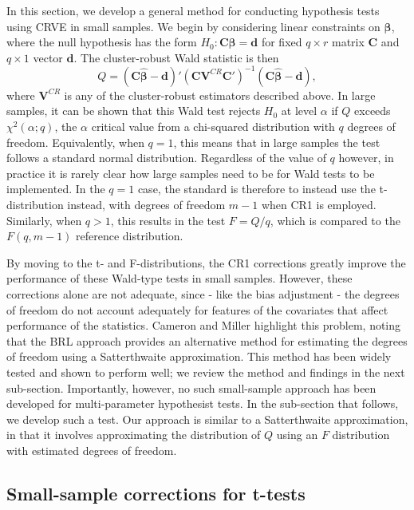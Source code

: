 \documentclass[12pt]{article}
\newcommand{\bm}{\mathbf}
\newcommand{\bs}{\boldsymbol}
\begin{document}
In this section, we develop a general method for conducting hypothesis tests using CRVE in small samples. We begin by considering linear constraints on $\bs\beta$, where the null hypothesis has the form $H_0: \bm{C}\bs\beta = \bm{d}$ for fixed $q \times r$ matrix $\bm{C}$ and $q \times 1$ vector $\bm{d}$. 
The cluster-robust Wald statistic  is then
\begin{equation}
\label{eq:Wald_stat}
Q = \left(\bm{C}\bs{\hat\beta} - \bm{d}\right)'\left(\bm{C} \bm{V}^{CR} \bm{C}'\right)^{-1}\left(\bm{C}\bs{\hat\beta} - \bm{d}\right),
\end{equation}
where $\bm{V}^{CR}$ is any of the cluster-robust estimators described above.
In large samples, it can be shown that this Wald test rejects $H_0$ at level $\alpha$ if $Q$ exceeds $\chi^2(\alpha; q)$, the $\alpha$ critical value from a chi-squared distribution with $q$ degrees of freedom. 
Equivalently, when $q = 1$, this means that in large samples the test follows a standard normal distribution. 
Regardless of the value of $q$ however, in practice it is rarely clear how large samples need to be for Wald tests to be implemented.
In the $q = 1$ case, the standard is therefore to instead use the t-distribution instead, with degrees of freedom $m - 1$ when CR1 is employed.
Similarly, when $q > 1$, this results in the test $F = Q/q$, which is compared to the $F(q, m - 1)$ reference distribution. 

By moving to the t- and F-distributions, the CR1 corrections greatly improve the performance of these Wald-type tests in small samples.
However, these corrections alone are not adequate, since - like the bias adjustment - the degrees of freedom do not account adequately for features of the covariates that affect performance of the statistics.
Cameron and Miller highlight this problem, noting that the BRL approach provides an alternative method for estimating the degrees of freedom using a Satterthwaite approximation. 
This method has been widely tested and shown to perform well; we review the method and findings in the next sub-section.
Importantly, however, no such small-sample approach has been developed for multi-parameter hypothesist tests. 
In the sub-section that follows, we develop such a test.
Our approach is similar to a Satterthwaite approximation, in that it involves approximating the distribution of $Q$ using an $F$ distribution with estimated degrees of freedom. 

\subsection{Small-sample corrections for t-tests}
 
\end{document}

